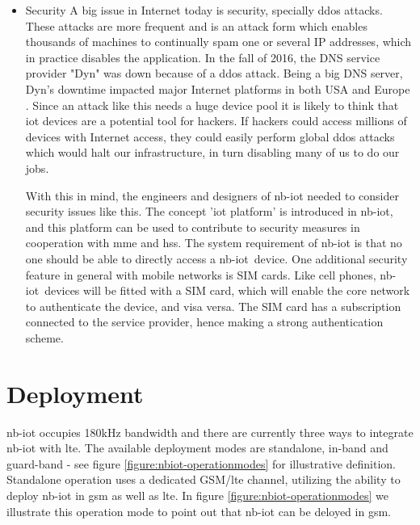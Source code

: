 \documentclass[USenglish]{ifimaster}  %
\begin{document}
\begin{itemize}
  \item Security \newline
  A big issue in Internet today is security, specially \acrshort{ddos} attacks. These attacks are more frequent and is an attack form which enables thousands of machines to continually spam one or several IP addresses, which in practice disables the application. In the fall of 2016, the DNS service provider "Dyn" was down because of a \acrshort{ddos} attack. Being a big DNS server, Dyn's downtime impacted major Internet platforms in both USA and Europe \cite{online:ddosAttack}. Since an attack like this needs a huge device pool it is likely to think that \acrshort{iot} devices are a potential tool for hackers. If hackers could access millions of devices with Internet access, they could easily perform global \acrshort{ddos} attacks which would halt our infrastructure, in turn disabling many of us to do our jobs.

  With this in mind, the engineers and designers of \acrshort{nb-iot} needed to consider security issues like this. The concept '\acrshort{iot} platform' is introduced in \acrshort{nb-iot}, and this platform can be used to contribute to security measures in cooperation with \acrshort{mme} and \acrshort{hss}. The system requirement of \acrshort{nb-iot} is that no one should be able to directly access a \acrshort{nb-iot} device. One additional security feature in general with mobile networks is SIM cards. Like cell phones, \acrshort{nb-iot} devices will be fitted with a SIM card, which will enable the core network to authenticate the device, and visa versa. The SIM card has a subscription connected to the service provider, hence making a strong authentication scheme.
\end{itemize}

\section{Deployment} \label{section:nb-iot-deployment}
\acrshort{nb-iot} occupies 180kHz bandwidth and there are currently three ways to integrate \acrshort{nb-iot} with \acrshort{lte}. The available deployment modes are standalone, in-band and guard-band - see figure \vref{figure:nbiot-operationmodes} for illustrative definition. Standalone operation uses a dedicated GSM/\acrshort{lte} channel, utilizing the ability to deploy \acrshort{nb-iot} in \acrshort{gsm} as well as \acrshort{lte}. In figure \vref{figure:nbiot-operationmodes} we illustrate this operation mode to point out that \acrshort{nb-iot} can be deloyed in \acrshort{gsm}.
\end{document}
